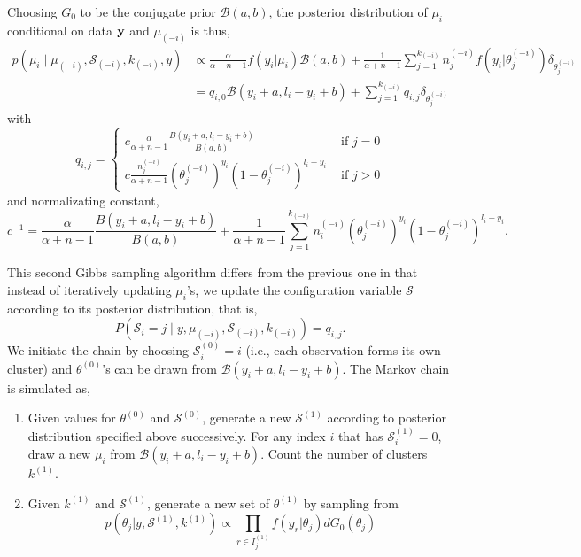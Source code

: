 \documentclass[12pt]{amsart}
\begin{document}
{Choosing $G_{0}$ to be the conjugate prior $\mathcal{B}(a,b)$, the posterior 
distribution of $\mu_{i}$ conditional on data $\bf{y}$ and $\mu_{(-i)}$ is thus, 
\[
\begin{array}{ll}
p(\mu_{i} \mid \mu_{(-i)}, \mathcal{S}_{(-i)},  k_{(-i)}, y)  & \propto \frac{\alpha}{\alpha+n-1} f(y_{i} | \mu_{i}) \mathcal{B}(a,b) + \frac{1}{\alpha +n-1} \sum_{j=1}^{ k_{(-i)}}  n_{j}^{(-i)} f(y_{i} | \theta_{j}^{(-i)}) \delta_{\theta_{j}^{(-i)}}\\
& = q_{i,0} \mathcal{B}(y_{i}+a, l_{i}-y_{i}+b) + \sum_{j=1}^{k_{(-i)}} q_{i,j} \delta_{\theta_{j}^{(-i)}}
\end{array}
\]
with 
\[
q_{i,j}=
\begin{cases}
c \frac{\alpha}{\alpha+n-1} \frac{B(y_{i}+a, l_{i}-y_{i}+b)}{B(a,b)} & \mbox{  if   }   j=0\\
c \frac{n_{j}^{(-i)}}{\alpha+n-1} (\theta_{j}^{(-i)})^{y_{i}}(1-\theta_{j}^{(-i)})^{l_{i}-y_{i}} &\mbox{  if   } j >0
\end{cases}
\]
and normalizating constant,
\[
 c^{-1} = \frac{\alpha}{\alpha+n-1} \frac{B(y_{i}+a, l_{i}-y_{i}+b)}{B(a,b)}+ \frac{1}{\alpha+n-1} \sum_{j=1}^{k_{(-i)}} n_{i}^{(-i)} (\theta_{j}^{(-i)})^{y_{i}}(1-\theta_{j}^{(-i)})^{l_{i}-y_{i}}.
 \]
 
This second Gibbs sampling algorithm differs from the previous one in that instead of 
iteratively updating $\mu_{i}$'s, we update the configuration variable $\mathcal{S}$ 
according to its posterior distribution, that is, 
\[
P(\mathcal{S}_{i} =j \mid y, \mu_{(-i)}, \mathcal{S}_{(-i)}, k_{(-i)}) = q_{i,j}.
\]
We initiate the chain by choosing $\mathcal{S}_{i}^{(0)}=i$ (i.e., each observation forms 
its own cluster) and $\theta^{(0)}$'s can be drawn from $\mathcal{B}(y_{i}+a, l_{i}-y_{i}+b)$. 
The Markov chain is simulated as,
\begin{enumerate}
\item Given values for $\theta^{(0)}$ and $\mathcal{S}^{(0)}$, generate a new 
	$\mathcal{S}^{(1)}$ according to posterior distribution specified above successively. 
	For any index $i$ that has $\mathcal{S}_{i}^{(1)}=0$, draw a new $\mu_{i}$ 
	from $\mathcal{B}(y_{i}+a, l_{i}-y_{i}+b)$. Count the number of clusters $k^{(1)}$.

\item Given $k^{(1)}$ and $\mathcal{S}^{(1)}$, generate a new set of $\theta^{(1)}$ 
	by sampling from 
\[
p(\theta_{j} | y, \mathcal{S}^{(1)}, k^{(1)}) \propto \prod_{r \in I_{j}^{(1)}} f(y_{r}|\theta_{j})dG_{0}(\theta_{j})
\]


\end{enumerate}}
\end{document}
